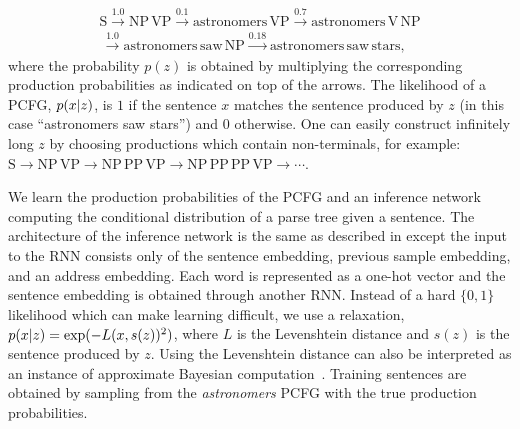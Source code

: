 \par\nobreak\vspace{-1.2em}
{\small
\begin{align*}
  \text{S} \xrightarrow{1.0} \text{NP}\,\text{VP} \xrightarrow{0.1} \text{astronomers}\,\text{VP} \xrightarrow{0.7} \text{astronomers}\,\text{V}\,\text{NP} \\
  \,\xrightarrow{1.0} \text{astronomers}\,\text{saw}\,\text{NP} \xrightarrow{0.18} \text{astronomers}\,\text{saw}\,\text{stars},
\end{align*}
}%
where the probability $p(z)$ is obtained by multiplying the corresponding production probabilities as indicated on top of the arrows.
The likelihood of a \gls{PCFG}, $p(x \lvert z)$, is $1$ if the sentence $x$ matches the sentence produced by $z$ (in this case ``astronomers saw stars'') and $0$ otherwise.
One can easily construct infinitely long $z$ by choosing productions which contain non-terminals, for example: $\text{S} \to \text{NP}\,\text{VP} \to \text{NP}\,\text{PP}\,\text{VP} \to \text{NP}\,\text{PP}\,\text{PP}\,\text{VP} \to \cdots$.


We learn the production probabilities of the \gls{PCFG} and an inference network computing the conditional distribution of a parse tree given a sentence.
%
The architecture of the inference network is the same as described in \citep[Section 3.3]{le2017inference} except the input to the \gls{RNN} consists only of the sentence embedding, previous sample embedding, and an address embedding.
%
Each word is represented as a one-hot vector and the sentence embedding is obtained through another \gls{RNN}.
%
Instead of a hard $\{0, 1\}$ likelihood which can make learning difficult, we use a relaxation, $p(x \lvert z) = \exp(-L(x, s(z))^2)$, where $L$ is the Levenshtein distance and $s(z)$ is the sentence produced by $z$.
%
Using the Levenshtein distance can also be interpreted as an instance of approximate Bayesian computation~\citep{Sisson2018handbook}.
%
Training sentences are obtained by sampling from the \emph{astronomers} \gls{PCFG} with the true production probabilities.

